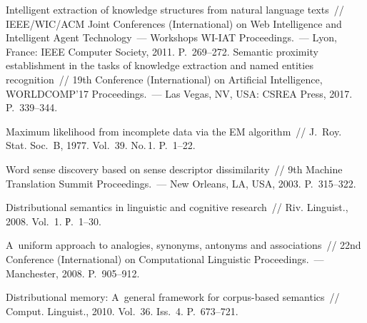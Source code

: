\begin{multicols}{2}
{\small\frenchspacing
 {\baselineskip=10.9pt
 \begin{thebibliography}{99}
     
 Intelligent extraction of knowledge 
structures from natural language texts~// IEEE/WIC/ACM Joint Conferences 
(International) on Web Intelligence and Intelligent Agent Technology~--- 
Workshops WI-IAT Proceedings.~--- Lyon, France: IEEE Computer Society, 2011. 
P.~269--272. 
 Semantic 
proximity establishment in the tasks of knowledge extraction and named entities recognition~// 
19th Conference (International) on Artificial Intelligence, WORLDCOMP'17 
Proceedings.~--- Las Vegas, NV, USA: CSREA Press, 2017. P.~339--344.

 Maximum likelihood from incomplete data 
via the EM algorithm~// J.~Roy. Stat. Soc.~B, 1977. Vol.~39. No.\,1. P.~1--22.

 Word sense discovery based on sense descriptor dissimilarity~//
9th Machine Translation Summit Proceedings.~--- New Orleans, LA, USA, 2003. P.~315--322.

 Distributional semantics in linguistic and cognitive research~// 
Riv. Linguist., 2008. Vol.~1. Р.~1--30.


 A~uniform approach to analogies, synonyms, 
antonyms and associations~// 22nd 
Conference (International) on Computational Linguistic Proceedings.~--- 
Manchester, 2008. P.~905--912.

 Distributional memory: A~general framework for corpus-based 
semantics~// Comput. Linguist., 2010. Vol.~36. Iss.~4. P.~673--721.


\end{thebibliography}}}
\end{multicols}
